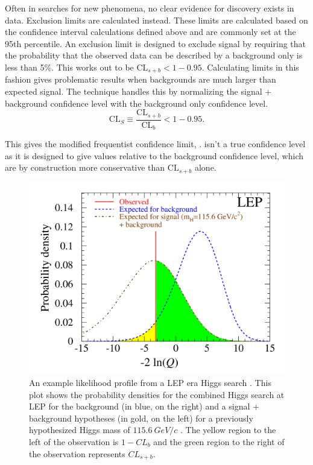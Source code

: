 Often in searches for new phenomena, no clear evidence for discovery exists in data. Exclusion limits are calculated instead. These limits are calculated based on the confidence interval calculations defined above and are commonly set at the 95th percentile. An exclusion limit is designed to exclude signal by requiring that the probability that the observed data can be described by a background only is less than 5\%. This works out to be $\mathrm{CL}_{s+b}<1-0.95$. Calculating limits in this fashion gives problematic results when backgrounds are much larger than expected signal. The \CLs technique handles this by normalizing the signal + background confidence level with the background only confidence level.
\begin{equation}
    \mathrm{CL}_{S}
    \equiv
    \frac{\mathrm{CL}_{s+b}}{\mathrm{CL}_{b}} < 1-0.95.
\end{equation}

This gives the modified frequentist confidence limit, \CLs. \CLs isn't a true confidence level as it is designed to give values relative to the background confidence level, which are by construction more conservative than $\mathrm{CL}_{s+b}$ alone.

\begin{figure}[!tp]
    \centering
    \includegraphics[width=\textwidth]{figures/CLS_2002_plots.pdf}
    \caption[
       Example likelihood profiles.
    ]{
        An example likelihood profile from a LEP era Higgs search \cite{CLS2002}.
        This plot shows the probability densities for the combined Higgs search at LEP for the background (in blue, on the right) and a
signal + background hypotheses (in gold, on the left) for a previously hypothesized Higgs mass of \ensuremath{\SI{115.6}{GeV/c}} . The yellow region to the left of the observation is $1 − CL_{b}$ and the green region to the right of the observation represents $CL_{s+b}$.
    }
    \label{fig:LEP_CLS_Higgs}
\end{figure}

